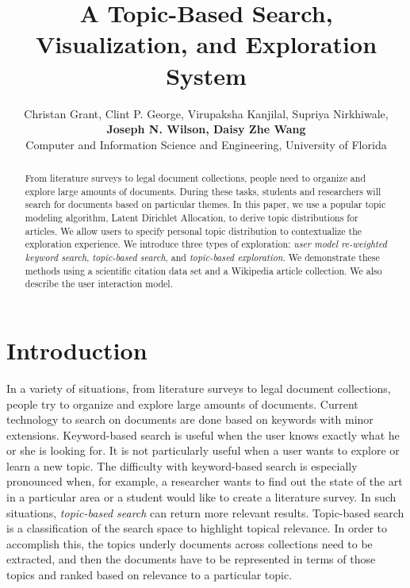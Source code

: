 \documentclass[letterpaper]{article}
\begin{document}
\title{A Topic-Based Search, Visualization, and Exploration System}
\author{Christan Grant, Clint P. George, Virupaksha Kanjilal, Supriya Nirkhiwale, \\ 
{\bf \Large Joseph N. Wilson, Daisy Zhe Wang}\\
Computer and Information Science and Engineering, University of Florida}

\maketitle


\begin{abstract}

From literature surveys to legal document collections, people need to organize and explore large amounts of documents.
During these tasks, students and researchers will search for documents based on particular themes.
In this paper, we use a popular topic modeling algorithm, Latent Dirichlet Allocation, to derive topic distributions for articles.
We allow users to specify personal topic distribution to contextualize the exploration experience.
We introduce three types of exploration: \textsl{user model re-weighted keyword search},
\textsl{topic-based search}, and \textsl{topic-based exploration}. 
We demonstrate these methods using a scientific citation 
data set and a Wikipedia article collection.
We also describe the user interaction model.

\end{abstract}



\section{Introduction}

In a variety of situations, from literature surveys to legal 
document collections, people try to organize and explore large 
amounts of documents. Current technology to search on documents are 
done based on keywords with minor extensions. Keyword-based search is useful when the 
user knows exactly what he or she is looking for. It is not 
particularly useful when a user wants to explore or learn a new 
topic. 
The difficulty with keyword-based search is especially pronounced when, for
example, a researcher wants to find out the state of the art in a particular
area or a student would like to create a literature survey. In such situations,
\textsl{topic-based search} can return more relevant results. 
Topic-based search is a classification of the search space to 
highlight topical relevance. In order to accomplish this, the topics 
underly documents across collections need to be extracted, and then 
the documents have to be represented in terms of those topics and ranked 
based on relevance to a particular topic. 
\end{document}
